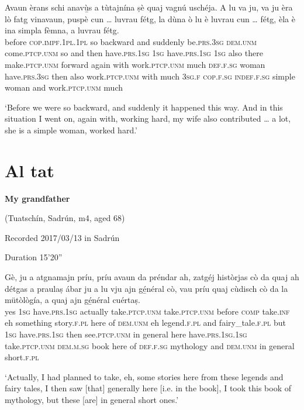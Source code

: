 \begin{linenumbers}
\gll    Avaun èrans schi anavù̱s a tùtajnína ṣè quaj vagnú uschéja. A lu va ju, va ju èra lò fatg vinavaun, puspè cun … luvrau fétg, la dùna ò lu è luvrau cun … fétg, èla è ina simpla fèmna, a luvrau fétg.\\
before \textsc{cop.impf.1pl.1pl} so backward and suddenly be.\textsc{prs.3sg} \textsc{dem.unm} come.\textsc{ptcp.unm} so and then have.\textsc{prs.1sg} \textsc{1sg} have.\textsc{prs.1sg} \textsc{1sg} also there  make.\textsc{ptcp.unm} forward again with {} work.\textsc{ptcp.unm} much \textsc{def.f.sg} woman have.\textsc{prs.3sg} then also work.\textsc{ptcp.unm} with {} much \textsc{3sg.f} \textsc{cop.f.sg} \textsc{indef.f.sg} simple woman and work.\textsc{ptcp.unm} much\\
\end{linenumbers}
\medskip
\glt `Before we were so backward, and suddenly it happened this way. And in this situation I went on, again with, working hard, my wife also contributed … a lot, she is a simple woman, worked hard.'
\medskip

\section{Al tat}\label{sec:8.3}


\textbf{My grandfather}

\noindent
(Tuatschín, Sadrún, m4, aged 68)

\noindent
Recorded 2017/03/13 in Sadrún

\noindent
Duration 15'20''
\bigskip

\begin{linenumbers}
\gll Gè, ju a atgnamajn príu, príu avaun da préndar ah, zatgéj històrjas cò da quaj ah détgas a praulaṣ ábar ju a lu vju ajn gé̱néral cò, vau príu quaj cùdisch cò da la mütòlògía\footnotemark, a quaj ajn gé̱néral cuértaṣ.\\
yes \textsc{1sg} have.\textsc{prs.1sg} actually take.\textsc{ptcp.unm} take.\textsc{ptcp.unm} before \textsc{comp} take.\textsc{inf} eh something story.\textsc{f.pl} here of \textsc{dem.unm} eh legend.\textsc{f.pl} and fairy\_tale.\textsc{f.pl} but \textsc{1sg} have.\textsc{prs.1sg} then see.\textsc{ptcp.unm} in general here have.\textsc{prs.1sg.1sg} take.\textsc{ptcp.unm}  \textsc{dem.m.sg} book here of \textsc{def.f.sg} mythology and  \textsc{dem.unm} in general short.\textsc{f.pl} \\
\end{linenumbers}
\medskip
\glt `Actually, I had planned to take, eh, some stories here from these legends and fairy tales, I then saw [that] generally here [i.e. in the book], I took this book of mythology, but these [are] in general short ones.'
\medskip

